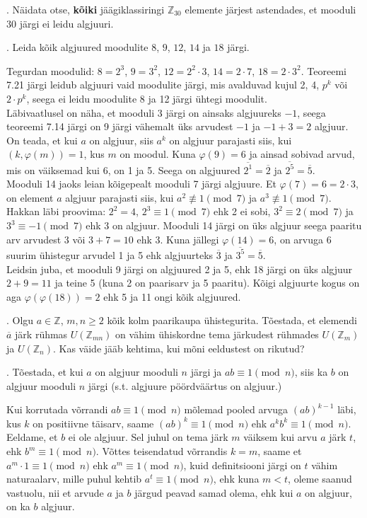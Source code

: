 \documentclass[a4paper, 10pt]{article}
\newcommand{\Z}{\mathbb{Z}}
\newcommand{\w}{\overline}
\begin{document}
. Näidata otse, {\bf kõiki} jäägiklassiringi $\mathbb{Z}_{30}$ elemente järjest astendades, et mooduli $30$ järgi ei leidu algjuuri. 

\bigskip

. Leida kõik algjuured moodulite $8$, $9$, $12$, $14$ ja $18$ järgi. 

\bigskip
Tegurdan moodulid: $8=2^3$, $9=3^2$, $12=2^2\cdot3$, $14=2\cdot7$, $18=2\cdot3^2$. Teoreemi 7.21 järgi leidub algjuuri vaid moodulite järgi, mis avalduvad kujul 2, 4, $p^k$ või $2\cdot p^k$, seega ei leidu moodulite 8 ja 12 järgi ühtegi moodulit.\\
\indent Läbivaatlusel on näha, et mooduli 3 järgi on ainsaks algjuureks $-1$, seega teoreemi 7.14 järgi on 9 järgi vähemalt üks arvudest $-1$ ja $-1+3=2$ algjuur. On teada, et kui $a$ on algjuur, siis $a^k$ on algjuur parajasti siis, kui $(k,\varphi(m))=1$, kus $m$ on moodul. Kuna $\varphi(9)=6$ ja ainsad sobivad arvud, mis on väiksemad kui 6, on 1 ja 5. Seega on algjuured $\w{2^1}=\w2$ ja $\w{2^5}=\w5$.\\
\indent Mooduli 14 jaoks leian kõigepealt mooduli 7 järgi algjuure. Et $\varphi(7)=6=2\cdot3$, on element $a$ algjuur parajasti siis, kui $a^2\not\equiv1\pmod7$ ja $a^3\not\equiv1\pmod7$. Hakkan läbi proovima: $2^2=4$, $2^3\equiv1\pmod7$ ehk 2 ei sobi, $3^2\equiv2\pmod7$ ja $3^3\equiv-1\pmod7$ ehk 3 on algjuur. Mooduli 14 järgi on üks algjuur seega paaritu arv arvudest 3 või $3+7=10$ ehk 3. Kuna jällegi $\varphi(14)=6$, on arvuga 6 suurim ühistegur arvudel 1 ja 5 ehk algjuurteks $\w3$ ja $\w{3^5}=\w5$.\\
\indent Leidsin juba, et mooduli 9 järgi on algjuured 2 ja 5, ehk 18 järgi on üks algjuur $2+9=11$ ja teine 5 (kuna 2 on paarisarv ja 5 paaritu). Kõigi algjuurte kogus on aga $\varphi(\varphi(18))=2$ ehk 5 ja 11 ongi kõik algjuured.
\bigskip

. Olgu $a\in\Z$, $m,n\geq 2$ kõik kolm paarikaupa ühistegurita. Tõestada, et elemendi $\overline{a}$ järk rühmas $U(\Z_{mn})$ on vähim ühiskordne tema järkudest rühmades $U(\Z_{m})$ ja $U(\Z_{n})$. Kas väide jääb kehtima, kui mõni eeldustest on rikutud?

\bigskip

. T\~oestada, et kui $a$ on algjuur mooduli $n$ j\"argi ja $ab\equiv 1\pmod{n}$, siis ka $b$ on algjuur mooduli $n$ j\"argi (s.t. algjuure pöördväärtus on algjuur.)

\bigskip
Kui korrutada võrrandi $ab\equiv1\pmod n$ mõlemad pooled arvuga $(ab)^{k-1}$ läbi, kus $k$ on positiivne täisarv, saame $(ab)^k\equiv1\pmod n$ ehk $a^kb^k\equiv1\pmod n$. Eeldame, et $b$ ei ole algjuur. Sel juhul on tema järk $m$ väiksem kui arvu $a$ järk $t$, ehk $b^m\equiv1\pmod n$. Võttes teisendatud võrrandis $k=m$, saame et $a^m\cdot1\equiv1\pmod n$ ehk $a^m\equiv1\pmod n$, kuid definitsiooni järgi on $t$ vähim naturaalarv, mille puhul kehtib $a^t\equiv1\pmod n$, ehk kuna $m<t$, oleme saanud vastuolu, nii et arvude $a$ ja $b$ järgud peavad samad olema, ehk kui $a$ on algjuur, on ka $b$ algjuur.
\bigskip
\end{document}
